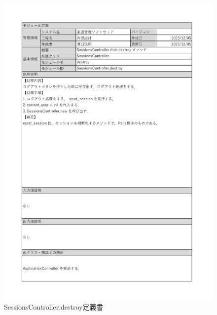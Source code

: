 \begin{figure}
    \centering
    \includegraphics[scale=0.7]{img/Sessions/xlsx/SessionsController.destroy.pdf}
    \vspace{-1cm}
    \caption{SessionsController.destroy定義書}
\end{figure}
